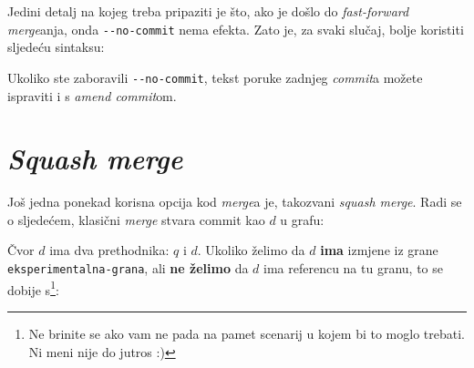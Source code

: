 Jedini detalj na kojeg treba pripaziti je što, ako je došlo do \emph{fast-forward} \emph{merge}anja, onda \verb+--no-commit+ nema efekta.
Zato je, za svaki slučaj, bolje koristiti sljedeću sintaksu:


Ukoliko ste zaboravili \verb+--no-commit+, tekst poruke zadnjeg \emph{commit}a možete ispraviti i s \emph{amend commit}om.

\section*{\emph{Squash merge}}

Još jedna ponekad korisna opcija kod \emph{merge}a je, takozvani \emph{squash merge}.
Radi se o sljedećem, klasični \emph{merge} stvara commit kao $d$ u grafu:



Čvor $d$ ima dva prethodnika: $q$ i $d$.
Ukoliko želimo da $d$ \textbf{ima} izmjene iz grane \verb+eksperimentalna-grana+, ali \textbf{ne želimo} da $d$ ima referencu na tu granu, to se dobije s\footnote{Ne brinite se ako vam ne pada na pamet scenarij u kojem bi to moglo trebati. Ni meni nije do jutros :)}:

